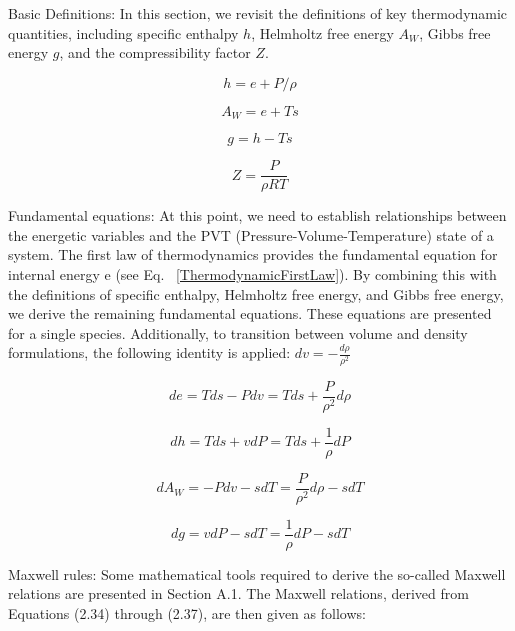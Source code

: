 	Basic Definitions: In this section, we revisit the definitions of key
	thermodynamic quantities, including specific enthalpy $h$, Helmholtz free
	energy $A_W$, Gibbs free energy $g$, and the compressibility factor $Z$.

	\begin{equation}
		h = e + P/\rho
	\end{equation}

	\begin{equation}
		A_W = e + Ts
	\end{equation}

	\begin{equation}
		g = h - Ts
	\end{equation}

	\begin{equation}
		Z = \frac{P}{\rho RT}
	\end{equation}

	Fundamental equations: At this point, we need to establish relationships
	between the energetic variables and the PVT (Pressure-Volume-Temperature)
	state of a system. The first law of thermodynamics provides the fundamental
	equation for internal energy e (see Eq. ~\ref{ThermodynamicFirstLaw}). By
	combining this with the definitions of specific enthalpy, Helmholtz free
	energy, and Gibbs free energy, we derive the remaining fundamental
	equations. These equations are presented for a single species. Additionally,
	to transition between volume and density formulations, the following
	identity is applied: $dv = -\frac{d\rho}{\rho ^2}$

	\begin{equation}
		de = Tds - Pdv = Tds + \frac{P}{\rho ^2}d\rho
		\label{ThermodynamicFirstLaw}
	\end{equation}

	\begin{equation}
		dh = Tds + vdP = Tds + \frac{1}{\rho}dP
	\end{equation}

	\begin{equation}
		dA_W = -Pdv -sdT = \frac{P}{\rho ^2}d\rho - sdT
	\end{equation}

	\begin{equation}
		dg = vdP - sdT = \frac{1}{\rho}dP -sdT
	\end{equation}

	Maxwell rules: Some mathematical tools required to derive the so-called
	Maxwell relations are presented in Section A.1. The Maxwell relations,
	derived from Equations (2.34) through (2.37), are then given as follows:


